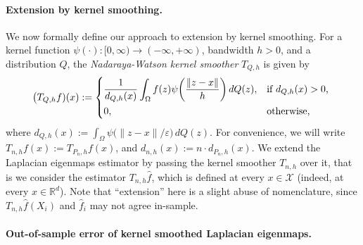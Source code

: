 \documentclass{article}
\newcommand{\Reals}{\mathbb{R}}
\newcommand{\1}{\mathbf{1}}
\newcommand{\Rd}{\Reals^d}
\newcommand{\mc}[1]{\mathcal{#1}}
\newcommand{\wh}[1]{\widehat{#1}}
\theoremstyle{alden}
\theoremstyle{aldenthm}
\theoremstyle{definition}
\theoremstyle{remark}
\begin{document}
\paragraph{Extension by kernel smoothing.}
We now formally define our approach to extension by kernel smoothing. For a kernel function $\psi(\cdot): [0,\infty) \to (-\infty,+\infty)$, bandwidth $h > 0$, and a distribution $Q$, the \emph{Nadaraya-Watson kernel smoother} $T_{Q,h}$ is given by
\begin{equation*}
\bigl(T_{Q,h}f)(x) := 
\begin{dcases*}
\frac{1}{d_{Q,h}(x)} \int_{\Omega} f(z)\psi\biggl(\frac{\|z - x\|}{h}\biggr) \,dQ(z), & \textrm{if $d_{Q,h}(x) > 0$,} \\
0, &\textrm{otherwise,}
\end{dcases*}
\end{equation*}
where $d_{Q,h}(x) := \int_{\Omega} \psi\bigl(\|z - x\|/\varepsilon\bigr) \,dQ(z)$. For convenience, we will write $T_{n,h}f(x) := T_{P_n,h}f(x)$, and $d_{n,h}(x) := n \cdot d_{P_n,h}(x)$.  We extend the Laplacian eigenmaps estimator by passing the kernel smoother $T_{n,h}$ over it, that is we consider the estimator $T_{n,h}\wh{f}$, which is defined at every $x \in \mc{X}$ (indeed, at every $x \in \Rd$). Note that ``extension'' here is a slight abuse of nomenclature, since $T_{n,h}\wh{f}(X_i)$ and $\wh{f}_i$ may not agree in-sample.

\paragraph{Out-of-sample error of kernel smoothed Laplacian eigenmaps.}
\end{document}
